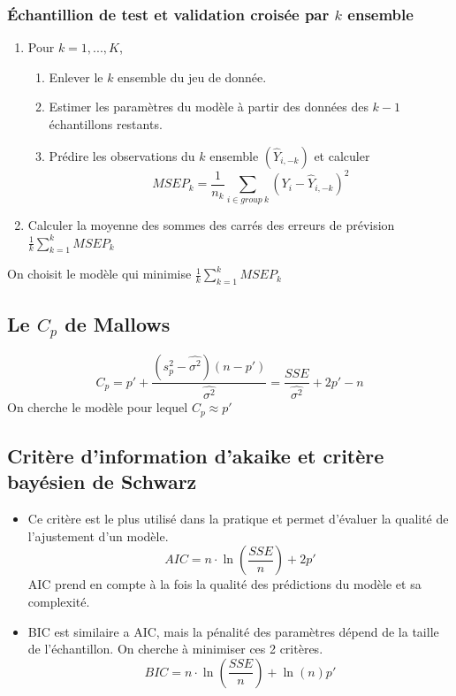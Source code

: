 \documentclass[10pt, french]{article}
\begin{document}
\begin{multicols*}{3}
\subsubsection*{Échantillion de test et validation croisée par $k$ ensemble}
\begin{enumerate}
\item Pour $k = 1, ..., K$,
\begin{enumerate}[label=1.\arabic*]
	\item Enlever le $k$ ensemble du jeu de donnée.
	\item  Estimer les paramètres du modèle à partir des données des $k - 1$ échantillons restants.
	\item Prédire les observations du $k$ ensemble $(\hat{Y}_{i,-k})$ et calculer
	\[ MSEP_k = \frac{1}{n_k} \sum_{i\in group\:k} (Y_i - \hat{Y}_{i,-k})^2 \]
\end{enumerate}
	\item Calculer la moyenne des sommes des carrés des erreurs de prévision $\frac{1}{k} \sum_{k=1}^k MSEP_k$
\end{enumerate}
	On choisit le modèle qui minimise $\frac{1}{k} \sum_{k=1}^k MSEP_k$


\subsection*{Le $C_p$ de Mallows}
\[ C_p = p' + \frac{(s_p^2 - \hat{\sigma^2})(n - p')}{\hat{\sigma^2}} = \frac{SSE}{\hat{\sigma^2}} + 2p' - n\]
On cherche le modèle pour lequel $C_p \approx p'$

\subsection*{Critère d'information d'akaike et critère bayésien de Schwarz}
\begin{itemize}
\item Ce critère est le plus utilisé dans la pratique et permet d'évaluer la qualité de l'ajustement d'un modèle. 
\[ AIC = n \cdot \ln \left(\frac{SSE}{n}\right) + 2p' \]
AIC prend en compte à la fois la qualité des prédictions du modèle et sa complexité.
\item BIC est similaire a AIC, mais la pénalité des paramètres dépend de la taille de l'échantillon.
On cherche à minimiser ces 2 critères.
\[ BIC = n \cdot \ln \left(\frac{SSE}{n}\right) + \ln(n)p' \]
\end{itemize}






\end{multicols*}
\end{document}
